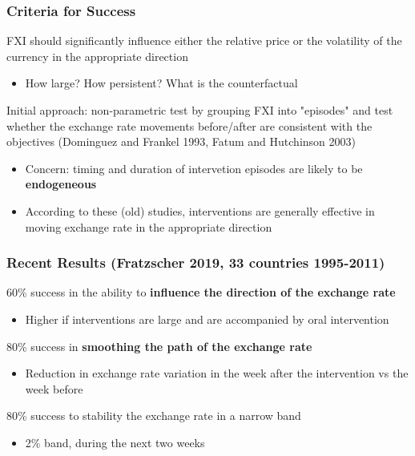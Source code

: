 \documentclass{beamer}
\newenvironment{wideitemize}{\itemize\addtolength{\itemsep}{10pt}}{\enditemize}
\newenvironment{wideenumerate}{\enumerate\addtolength{\itemsep}{10pt}}{\endenumerate}
\begin{document}
\begin{frame}
  \frametitle{Criteria for Success}
  \begin{wideitemize}
    \item FXI should significantly influence either the relative price or the volatility of the currency in the appropriate direction
      \begin{itemize}
      \item How large? How persistent? What is the counterfactual
      \end{itemize}
    \item Initial approach: non-parametric test by grouping FXI into "episodes" and test whether the exchange rate movements before/after are consistent with the objectives (Dominguez and Frankel 1993, Fatum and Hutchinson 2003)
      \begin{itemize}
      \item Concern: timing and duration of intervetion episodes are likely to be \textbf{endogeneous}
      \item According to these (old) studies, interventions are generally effective in moving exchange rate in the appropriate direction
      \end{itemize}
  \end{wideitemize}
\end{frame}


\begin{frame}
  \frametitle{Recent Results (Fratzscher 2019, 33 countries 1995-2011)}
  \begin{wideenumerate}
  \item 60\% success in the ability to \textbf{influence the direction of the exchange rate}
    \begin{itemize}
    \item Higher if interventions are large and are accompanied by oral intervention
    \end{itemize}
  \item 80\% success in \textbf{smoothing the path of the exchange rate}
    \begin{itemize}
    \item Reduction in exchange rate variation in the week after the intervention vs the week before
    \end{itemize}
  \item 80\% success to stability the exchange rate in a narrow band
    \begin{itemize}
    \item 2\% band, during the next two weeks
    \end{itemize}
  \end{wideenumerate}
\end{frame}
\end{document}
